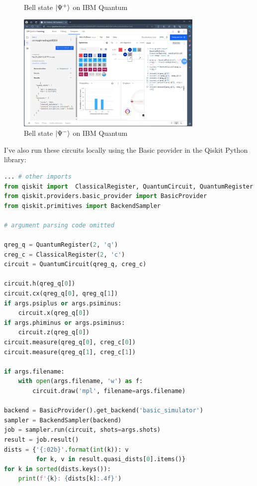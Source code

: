 \documentclass[12pt]{extarticle}
\begin{document}
\begin{enumerate}[(i)]
\begin{figure}[H]
\caption{Bell state $\ket{\Psi^{+}}$ on IBM Quantum}
\end{figure}
\begin{figure}[H]
\centering
\includegraphics[width=0.80\textwidth]{images/Bell-PsiMinus-IBM-Quantum.png}
\caption{Bell state $\ket{\Psi^{-}}$ on IBM Quantum}
\end{figure}

I've also run these circuits locally using the Basic provider in the Qiskit Python library:
\begin{footnotesize}
\begin{lstlisting}[language=Python]
... # other imports
from qiskit import  ClassicalRegister, QuantumCircuit, QuantumRegister
from qiskit.providers.basic_provider import BasicProvider
from qiskit.primitives import BackendSampler

# argument parsing code omitted

qreg_q = QuantumRegister(2, 'q')
creg_c = ClassicalRegister(2, 'c')
circuit = QuantumCircuit(qreg_q, creg_c)

circuit.h(qreg_q[0])
circuit.cx(qreg_q[0], qreg_q[1])
if args.psiplus or args.psiminus:
    circuit.x(qreg_q[0])
if args.phiminus or args.psiminus:
    circuit.z(qreg_q[0])
circuit.measure(qreg_q[0], creg_c[0])
circuit.measure(qreg_q[1], creg_c[1])

if args.filename:
    with open(args.filename, 'w') as f:
        circuit.draw('mpl', filename=args.filename)

backend = BasicProvider().get_backend('basic_simulator')
sampler = BackendSampler(backend)
job = sampler.run(circuit, shots=args.shots)
result = job.result()
dists = {'{:02b}'.format(int(k)): v
         for k, v in result.quasi_dists[0].items()}
for k in sorted(dists.keys()):
    print(f'{k}: {dists[k]:.4f}')
\end{lstlisting}
\end{footnotesize}


\end{enumerate}
\end{document}
